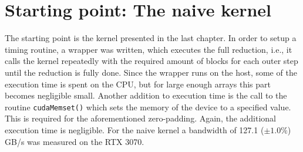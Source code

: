\section{Starting point: The naive kernel}
The starting point is the kernel presented in the last chapter.
In order to setup a timing routine, a wrapper was written, which executes the full reduction, i.e., it calls the kernel repeatedly with the required amount of blocks for each outer step until the reduction is fully done. 
Since the wrapper runs on the host, some of the execution time is spent on the CPU, but for large enough arrays this part becomes negligible small.
Another addition to execution time is the call to the routine \texttt{cudaMemset()} which sets the memory of the device to a specified value.
This is required for the aforementioned zero-padding.
Again, the additional execution time is negligible.
For the naive kernel a bandwidth of 127.1 (\(\pm 1.0\% \)) GB/s was measured on the RTX 3070.

